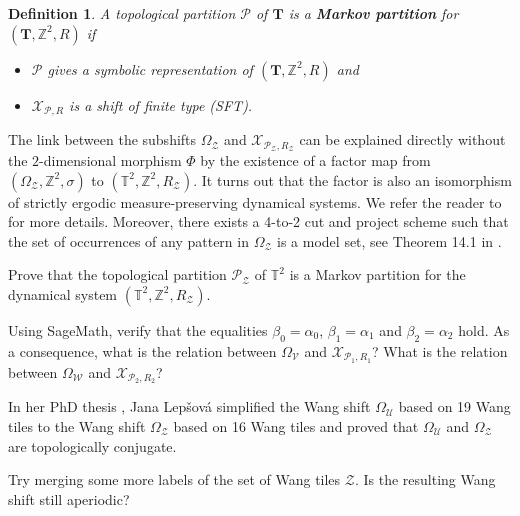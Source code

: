 \documentclass[12pt]{amsart}
\newtheorem{definition}{Definition}[section]
\newcommand{\Z}{\mathbb{Z}}
\newcommand{\Pcal}{\mathcal{P}}
\newcommand{\Ucal}{\mathcal{U}}
\newcommand{\Vcal}{\mathcal{V}}
\newcommand{\Wcal}{\mathcal{W}}
\newcommand{\Xcal}{\mathcal{X}} %
\newcommand{\Zcal}{\mathcal{Z}}
\newcommand{\generictorus}{{\boldsymbol{T}}}
\newcommand{\torus}{\mathbb{T}}
\newcommand{\ifnv}[2]{\ifthenelse{\equal{#1}{}}{}{#2}}
\newcommand\defn[2][]{\ifnv{#1}{\index{#1|\textbf}}{\index{#2|\textbf}}\textbf{#2}}
\begin{document}
\begin{definition}\label{def:Markov}
A topological partition $\Pcal$ of $\generictorus$ is a \defn{Markov partition} for
$(\generictorus,\Z^2,R)$ if 
\begin{itemize}
    \item $\Pcal$ gives a symbolic representation of $(\generictorus,\Z^2,R)$ and 
    \item $\Xcal_{\Pcal,R}$ is a shift of finite type (SFT).
\end{itemize}
\end{definition}

The link between the subshifts
$\Omega_\Zcal$ and
$\Xcal_{\Pcal_\Zcal,R_\Zcal}$
can be explained directly without the $2$-dimensional morphism $\Phi$ by the existence of
a factor map from $(\Omega_\Zcal,\Z^2,\sigma)$ to $(\torus^2,\Z^2,R_\Zcal)$.
It turns out that the factor is also an isomorphism of strictly ergodic
measure-preserving dynamical systems.
We refer the reader to \cite{MR4213162} for more details.
Moreover, there exists a 4-to-2 cut and project scheme such that
the set of occurrences of any pattern in $\Omega_\Zcal$
is a model set, see Theorem 14.1 in \cite{MR4213162}.


\begin{exo}[label={exo:Markof-Partition}]
    Prove that the topological partition
$\Pcal_\Zcal$ of $\torus^2$ is a Markov partition for the dynamical system
$(\torus^2,\Z^2,R_\Zcal)$.
\end{exo}


\begin{exo}[label={exo:equality-of-substitutions}]
    Using SageMath,
    verify that the equalities $\beta_0=\alpha_0$, $\beta_1=\alpha_1$
    and $\beta_2=\alpha_2$ hold. 
    As a consequence, what is the relation between $\Omega_\Vcal$ and
    $\Xcal_{\Pcal_1,R_1}$?  What is the relation between $\Omega_\Wcal$ and
    $\Xcal_{\Pcal_2,R_2}$?
\end{exo}

\begin{exo}[label={exo:further-simplification}]
    In her PhD thesis \cite{lepsova_thesis_2024}, Jana Lepšová
    simplified the Wang shift $\Omega_\Ucal$ based on 19 Wang tiles
    to the Wang shift $\Omega_\Zcal$ based on 16 Wang tiles
    and proved that $\Omega_\Ucal$ and $\Omega_\Zcal$ are topologically conjugate.

    Try merging some more labels of the set of Wang tiles $\Zcal$.
    Is the resulting Wang shift still aperiodic?
\end{exo}
\end{document}
